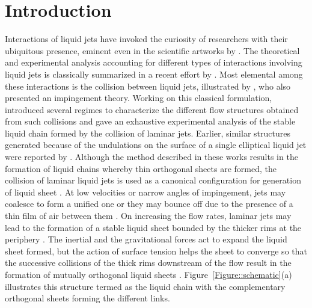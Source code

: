 \documentclass[%
 aip,
 sd,%
amsmath,amssymb,
preprint,%
author-year,%
]{revtex4-1}
\begin{document}
\section{Introduction}
Interactions of liquid jets have invoked the curiosity of researchers with their ubiquitous presence, eminent even in the scientific artworks by \cite{da1954notebooks}. The theoretical and experimental analysis accounting for different types of interactions involving liquid jets is classically summarized in a recent effort by \cite{eggers2008physics}. Most elemental among these interactions is the collision between liquid jets, illustrated by \cite{taylor1960formation}, who also presented an impingement theory. Working on this classical formulation, \cite{bush2004collision} introduced several regimes to characterize the different flow structures obtained from such collisions and gave an exhaustive experimental analysis of the stable liquid chain formed by the collision of laminar jets. Earlier, similar structures generated because of the undulations on the surface of a single elliptical liquid jet were reported by \cite{rayleigh1879capillary,rayleigh1889tension}. Although the method described in these works results in the formation of liquid chains whereby thin orthogonal sheets are formed, the collision of laminar liquid jets is used as a canonical configuration for generation of liquid sheet \citep{bush2004collision}. At low velocities or narrow angles of impingement, jets may coalesce to form a unified one or they may bounce off due to the presence of a thin film of air between them \citep{wadhwa2013noncoalescence}. On increasing the flow rates, laminar jets may lead to the formation of a stable liquid sheet bounded by the thicker rims at the periphery \citep{yang2014liquid}. The inertial and the gravitational forces act to expand the liquid sheet formed, but the action of surface tension helps the sheet to converge so that the successive collisions of the thick rims downstream of the flow result in the formation of mutually orthogonal liquid sheets \citep{bush2004collision}. Figure~\ref{Figure::schematic}(a) illustrates this structure termed as the liquid chain with the complementary orthogonal sheets forming the different links.\\
\end{document}
